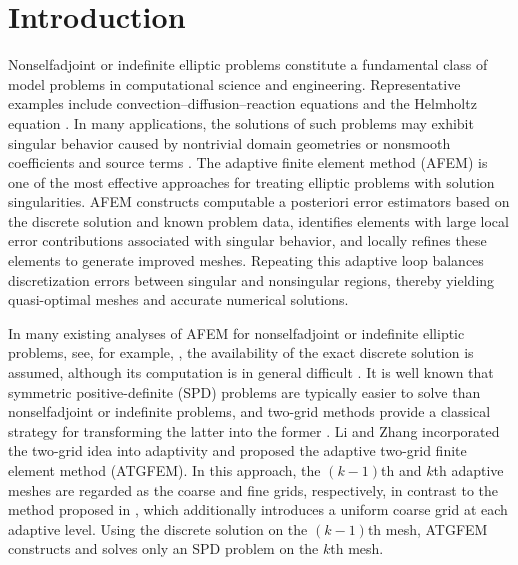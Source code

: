 \documentclass[preprint,times]{elsarticle}%
\numberwithin{algorithm}{section}
\numberwithin{equation}{section}
\begin{document}


\section{Introduction}\label{sect1}
Nonselfadjoint or indefinite elliptic problems constitute a fundamental class of model problems in computational science and engineering. Representative examples include convection–diffusion–reaction equations \cite{DuSHXieXP15:1327,ZhongLQXuanY22:113903,AbdulleSouza22:110894} and the Helmholtz equation \cite{DuanSYWuHJ23:21,IrimieBouillard01:4027,DuYWuHJ15:782}. In many applications, the solutions of such problems may exhibit singular behavior caused by nontrivial domain geometries or nonsmooth coefficients and source terms \cite{Grisvard92Book,Mitchell13:350}. The adaptive finite element method (AFEM) \cite{Verfurth96book,verfurth13Book,AinsworthOden00Book} is one of the most effective approaches for treating elliptic problems with solution singularities. AFEM constructs computable a posteriori error estimators based on the discrete solution and known problem data, identifies elements with large local error contributions associated with singular behavior, and locally refines these elements to generate improved meshes. Repeating this adaptive loop balances discretization errors between singular and nonsingular regions, thereby yielding quasi-optimal meshes and accurate numerical solutions.

In many existing analyses of AFEM for nonselfadjoint or indefinite elliptic problems, see, for example, \cite{NochettoSiebert09:409,BespalovHaberl17:318,FeischlFuhrer14:601,MekchayNochetto05:1803}, the availability of the exact discrete solution is assumed, although its computation is in general difficult \cite{XuJC92:303}. It is well known that symmetric positive-definite (SPD) problems are typically easier to solve than nonselfadjoint or indefinite problems, and two-grid methods provide a classical strategy for transforming the latter into the former \cite{XuJC96:1759}.
Li and Zhang \cite{LiYkZhangY21:A908} incorporated the two-grid idea into adaptivity and proposed the adaptive two-grid finite element method (ATGFEM). In this approach, the 
$(k-1)$th and $k$th adaptive meshes are regarded as the coarse and fine grids, respectively, in contrast to the method proposed in \cite{BiCJWangC18:23}, which additionally introduces a uniform coarse grid at each adaptive level. Using the discrete solution on the $(k-1)$th mesh, ATGFEM constructs and solves only an SPD problem on the 
$k$th mesh.
\end{document}
